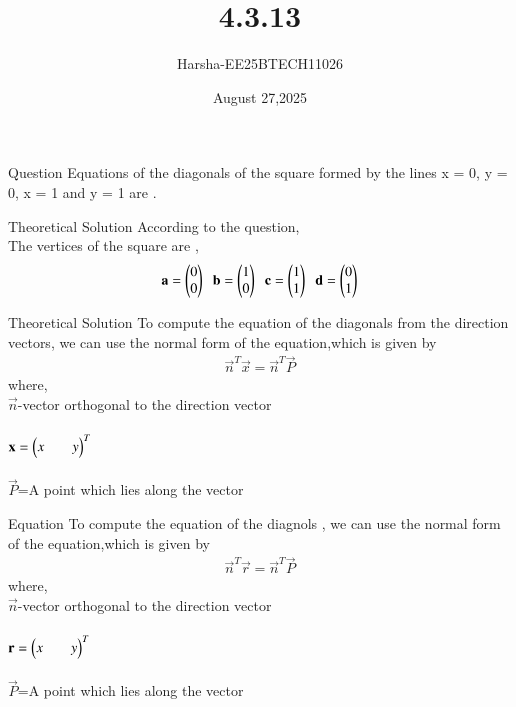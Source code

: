\documentclass{beamer}
\title %
{4.3.13}
\date{August 27,2025}
\author %
{Harsha-EE25BTECH11026}
\begin{document}
\frame{\titlepage}
\begin{frame}{Question}
Equations of the diagonals of the square formed by the lines x = 0, y = 0, x = 1 and y = 1 are \underline{\hspace{2cm}}.
\end{frame}

\begin{frame}{Theoretical Solution}
According to the question,\\
The vertices of the square are ,
\begin{align*}
    \mathbf{a}=\begin{pmatrix}0\\0\end{pmatrix}\;\;\mathbf{b}=\begin{pmatrix}1\\0\end{pmatrix}\;\;\mathbf{c}=\begin{pmatrix}1\\1\end{pmatrix}\;\;\mathbf{d}=\begin{pmatrix}0\\1\end{pmatrix}
\end{align*}
\end{frame}


\begin{frame}{Theoretical Solution}
To compute the equation of the diagonals from the direction vectors, we can use the normal form of the equation,which is given by
\begin{align*}
    \vec{n}^T\vec{x}=\vec{n}^T\vec{P}
\end{align*}
where,\\
\hspace*{4em}  $\vec{n}$-vector orthogonal to the direction vector\\
\\
\hspace*{4em}  $\mathbf{x}=\begin{pmatrix}x&&y\end{pmatrix}^T$ \\
\\
\hspace*{4em}  $\vec{P}$=A point which lies along the vector
\end{frame}

\begin{frame}{Equation}
To compute the equation of the diagnols , we can use the normal form of the equation,which is given by
\begin{align*}
    \vec{n}^T\vec{r}=\vec{n}^T\vec{P}
\end{align*}
where,\\
\hspace*{4em}  $\vec{n}$-vector orthogonal to the direction vector\\
\\
\hspace*{4em}  $\mathbf{r}=\begin{pmatrix}x&&y\end{pmatrix}^T$ \\
\\
\hspace*{4em}  $\vec{P}$=A point which lies along the vector\\
\end{frame}
\end{document}
